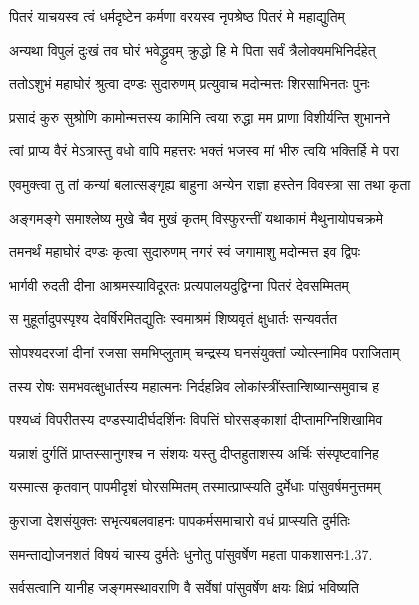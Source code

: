 \twolineshloka
{पितरं याचयस्व त्वं धर्मदृष्टेन कर्मणा}
{वरयस्व नृपश्रेष्ठ पितरं मे महाद्युतिम्}%

\twolineshloka
{अन्यथा विपुलं दुःखं तव घोरं भवेद्ध्रुवम्}
{क्रुद्धो हि मे पिता सर्वं त्रैलोक्यमभिनिर्दहेत्}%

\twolineshloka
{ततोऽशुभं महाघोरं श्रुत्वा दण्डः सुदारुणम्}
{प्रत्युवाच मदोन्मत्तः शिरसाभिनतः पुनः}%

\twolineshloka
{प्रसादं कुरु सुश्रोणि कामोन्मत्तस्य कामिनि}
{त्वया रुद्धा मम प्राणा विशीर्यन्ति शुभानने}%

\twolineshloka
{त्वां प्राप्य वैरं मेऽत्रास्तु वधो वापि महत्तरः}
{भक्तं भजस्व मां भीरु त्वयि भक्तिर्हि मे परा}%

\twolineshloka
{एवमुक्त्वा तु तां कन्यां बलात्सङ्गृह्य बाहुना}
{अन्येन राज्ञा हस्तेन विवस्त्रा सा तथा कृता}%

\twolineshloka
{अङ्गमङ्गे समाश्लेष्य मुखे चैव मुखं कृतम्}
{विस्फुरन्तीं यथाकामं मैथुनायोपचक्रमे}%

\twolineshloka
{तमनर्थं महाघोरं दण्डः कृत्वा सुदारुणम्}
{नगरं स्वं जगामाशु मदोन्मत्त इव द्विपः}%

\twolineshloka
{भार्गवी रुदती दीना आश्रमस्याविदूरतः}
{प्रत्यपालयदुद्विग्ना पितरं देवसम्मितम्}%

\twolineshloka
{स मुहूर्तादुपस्पृश्य देवर्षिरमितद्युतिः}
{स्वमाश्रमं शिष्यवृतं क्षुधार्तः सन्यवर्तत}%

\twolineshloka
{सोपश्यदरजां दीनां रजसा समभिप्लुताम्}
{चन्द्रस्य घनसंयुक्तां ज्योत्स्नामिव पराजिताम्}%

\twolineshloka
{तस्य रोषः समभवत्क्षुधार्तस्य महात्मनः}
{निर्दहन्निव लोकांस्त्रींस्तान्शिष्यान्समुवाच ह}%

\twolineshloka
{पश्यध्वं विपरीतस्य दण्डस्यादीर्घदर्शिनः}
{विपत्तिं घोरसङ्काशां दीप्तामग्निशिखामिव}%

\twolineshloka
{यन्नाशं दुर्गतिं प्राप्तस्सानुगश्च न संशयः}
{यस्तु दीप्तहुताशस्य अर्चिः संस्पृष्टवानिह}%

\twolineshloka
{यस्मात्स कृतवान् पापमीदृशं घोरसम्मितम्}
{तस्मात्प्राप्स्यति दुर्मेधाः पांसुवर्षमनुत्तमम्}%

\twolineshloka
{कुराजा देशसंयुक्तः सभृत्यबलवाहनः}
{पापकर्मसमाचारो वधं प्राप्स्यति दुर्मतिः}%

\twolineshloka
{समन्ताद्योजनशतं विषयं चास्य दुर्मतेः}
{धुनोतु पांसुवर्षेण महता पाकशासनः1.37.}%

\twolineshloka
{सर्वसत्वानि यानीह जङ्गमस्थावराणि वै}
{सर्वेषां पांसुवर्षेण क्षयः क्षिप्रं भविष्यति}%

